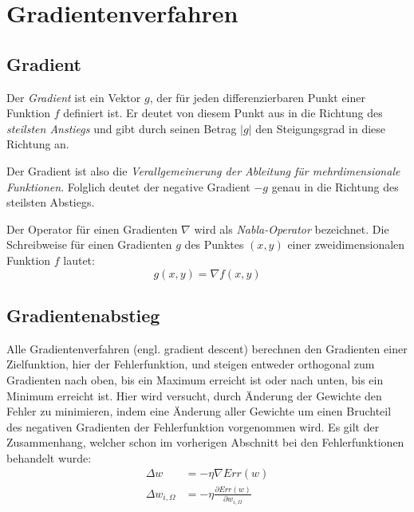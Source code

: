 \section*{Gradientenverfahren}
\subsection*{Gradient}
Der \emph{Gradient} ist ein Vektor $g$, der für jeden differenzierbaren Punkt einer Funktion $f$ definiert ist. Er deutet von diesem Punkt aus in die Richtung des \emph{steilsten Anstiegs} und gibt durch seinen Betrag $|g|$ den Steigungsgrad in diese Richtung an.

Der Gradient ist also die \emph{Verallgemeinerung der Ableitung für mehrdimensionale Funktionen}. Folglich deutet der negative Gradient $-g$ genau in die Richtung des steilsten Abstiegs.

Der Operator für einen Gradienten $\nabla$ wird als \emph{Nabla-Operator} bezeichnet. Die Schreibweise für einen Gradienten $g$ des Punktes $(x,y)$ einer zweidimensionalen Funktion $f$ lautet:
\[
	g(x,y) = \nabla f(x,y)
\]

\subsection*{Gradientenabstieg}
Alle Gradientenverfahren (engl. gradient descent) berechnen den Gradienten einer Zielfunktion, hier der Fehlerfunktion, und steigen entweder orthogonal zum Gradienten nach oben, bis ein Maximum erreicht ist oder nach unten, bis ein Minimum erreicht ist.
Hier wird versucht, durch Änderung der Gewichte den Fehler zu minimieren, indem eine Änderung aller Gewichte um einen Bruchteil des negativen Gradienten der Fehlerfunktion vorgenommen wird.
Es gilt der Zusammenhang, welcher schon im vorherigen Abschnitt bei den Fehlerfunktionen behandelt wurde:
\begin{align*}
	\Delta w &= - \eta \nabla Err(w) \\
	\Delta w_{i,\Omega} &= - \eta \frac{\partial Err(w)}{\partial w_{i,\Omega}}
\end{align*}

